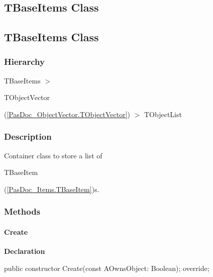 \documentclass{report}
\newif\ifpdf
\begin{document}
\subsection*{\large{\textbf{TBaseItems Class}}\normalsize\hspace{1ex}\hrulefill}
\else
\subsection*{TBaseItems Class}
\fi
\label{PasDoc_Items.TBaseItems}
\subsubsection*{\large{\textbf{Hierarchy}}\normalsize\hspace{1ex}\hfill}
TBaseItems {$>$} \begin{ttfamily}TObjectVector\end{ttfamily}(\ref{PasDoc_ObjectVector.TObjectVector}) {$>$} 
TObjectList
\subsubsection*{\large{\textbf{Description}}\normalsize\hspace{1ex}\hfill}
Container class to store a list of \begin{ttfamily}TBaseItem\end{ttfamily}(\ref{PasDoc_Items.TBaseItem})s.\subsubsection*{\large{\textbf{Methods}}\normalsize\hspace{1ex}\hfill}
\paragraph*{Create}\hspace*{\fill}

\label{PasDoc_Items.TBaseItems-Create}
\begin{list}{}{
\setlength{\itemindent}{0cm}
\setlength{\listparindent}{0cm}
\setlength{\leftmargin}{\evensidemargin}
\addtolength{\leftmargin}{\tmplength}
\settowidth{\labelsep}{X}
\addtolength{\leftmargin}{\labelsep}
\setlength{\labelwidth}{\tmplength}
}
\item[\textbf{Declaration}\hfill]
\ifpdf
\begin{flushleft}
\fi
\begin{ttfamily}
public constructor Create(const AOwnsObject: Boolean); override;\end{ttfamily}

\ifpdf
\end{flushleft}
\fi

\end{list}
\end{document}
